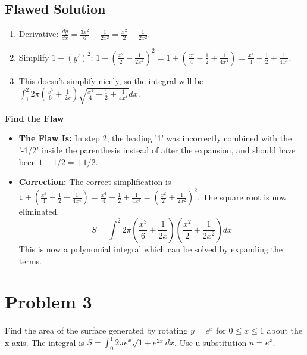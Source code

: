\documentclass{article}
\begin{document}
\subsection{Flawed Solution}
\begin{enumerate}
    \item Derivative: \(\frac{dy}{dx} = \frac{3x^2}{6} - \frac{1}{2x^2} = \frac{x^2}{2} - \frac{1}{2x^2}\).
    \item Simplify \(1+(y')^2\): \(1 + \left(\frac{x^2}{2} - \frac{1}{2x^2}\right)^2 = 1 + \left(\frac{x^4}{4} - \frac{1}{2} + \frac{1}{4x^4}\right) = \frac{x^4}{4} - \frac{1}{2} + \frac{1}{4x^4}\).
    \item This doesn't simplify nicely, so the integral will be \(\int_1^2 2\pi (\frac{x^3}{6}+\frac{1}{2x})\sqrt{\frac{x^4}{4} - \frac{1}{2} + \frac{1}{4x^4}} dx\).
\end{enumerate}
\textbf{Find the Flaw}
\begin{itemize}
    \item \textbf{The Flaw Is:} In step 2, the leading '1' was incorrectly combined with the '-1/2' inside the parenthesis instead of after the expansion, and should have been \(1 - 1/2 = +1/2\).
    \item \textbf{Correction:} The correct simplification is \(1 + (\frac{x^4}{4} - \frac{1}{2} + \frac{1}{4x^4}) = \frac{x^4}{4} + \frac{1}{2} + \frac{1}{4x^4} = (\frac{x^2}{2} + \frac{1}{2x^2})^2\). The square root is now eliminated.
    \[ S = \int_1^2 2\pi \left(\frac{x^3}{6}+\frac{1}{2x}\right)\left(\frac{x^2}{2} + \frac{1}{2x^2}\right) dx \]
    This is now a polynomial integral which can be solved by expanding the terms.
\end{itemize}

\section{Problem 3}
Find the area of the surface generated by rotating \(y=e^x\) for \(0 \le x \le 1\) about the x-axis. The integral is \(S = \int_0^1 2\pi e^x \sqrt{1+e^{2x}} dx\). Use u-substitution \(u=e^x\).
\end{document}
